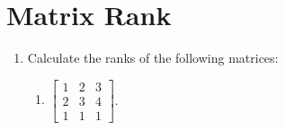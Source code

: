 \documentclass[a4paper,10pt]{article}
\begin{document}
\section{Matrix Rank}
\begin{enumerate}
\item Calculate the ranks of the following matrices:
\begin{enumerate}
    \item  $\begin{bmatrix}1&2&3\\2&3&4\\1&1&1\end{bmatrix}$.
\end{enumerate}


\end{enumerate}
\end{document}
